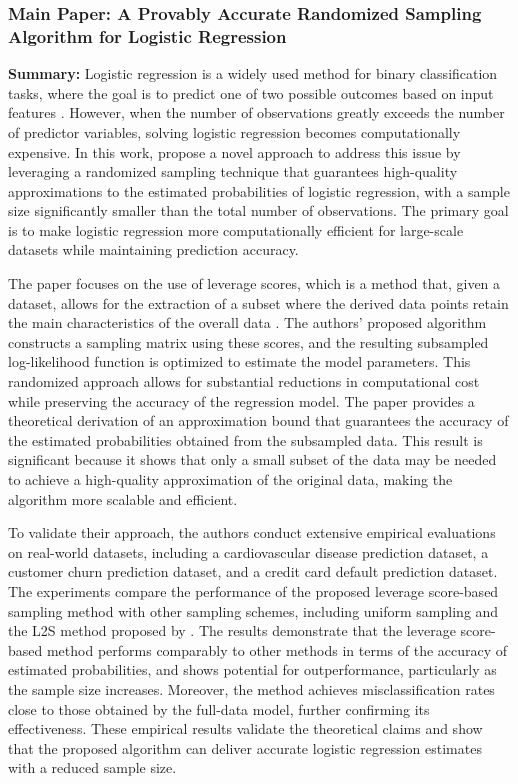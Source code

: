\documentclass{article}
\theoremstyle{plain}
\theoremstyle{definition}
\theoremstyle{remark}
\begin{document}
\subsubsection{Main Paper: A Provably Accurate Randomized Sampling Algorithm for Logistic Regression \cite{chow24}}

\textbf{Summary:} Logistic regression is a widely used method for binary classification tasks, where the goal is to predict one of two possible outcomes based on input features \cite{pml}. However, when the number of observations greatly exceeds the number of predictor variables, solving logistic regression becomes computationally expensive. In this work, \citeauthor{chow24} propose a novel approach to address this issue by leveraging a randomized sampling technique that guarantees high-quality approximations to the estimated probabilities of logistic regression, with a sample size significantly smaller than the total number of observations. The primary goal is to make logistic regression more computationally efficient for large-scale datasets while maintaining prediction accuracy.

The paper focuses on the use of leverage scores, which is a method that, given a dataset, allows for the extraction of a subset where the derived data points retain the main characteristics of the overall data \cite{ordo22}. The authors' proposed algorithm constructs a sampling matrix using these scores, and the resulting subsampled log-likelihood function is optimized to estimate the model parameters. This randomized approach allows for substantial reductions in computational cost while preserving the accuracy of the regression model.
The paper provides a theoretical derivation of an approximation bound that guarantees the accuracy of the estimated probabilities obtained from the subsampled data. This result is significant because it shows that only a small subset of the data may be needed to achieve a high-quality approximation of the original data, making the algorithm more scalable and efficient.

To validate their approach, the authors conduct extensive empirical evaluations on real-world datasets, including a cardiovascular disease prediction dataset, a customer churn prediction dataset, and a credit card default prediction dataset. The experiments compare the performance of the proposed leverage score-based sampling method with other sampling schemes, including uniform sampling and the L2S method proposed by \citeauthor{mun18}. The results demonstrate that the leverage score-based method performs comparably to other methods in terms of the accuracy of estimated probabilities, and shows potential for outperformance, particularly as the sample size increases. Moreover, the method achieves misclassification rates close to those obtained by the full-data model, further confirming its effectiveness. These empirical results validate the theoretical claims and show that the proposed algorithm can deliver accurate logistic regression estimates with a reduced sample size.
\end{document}
